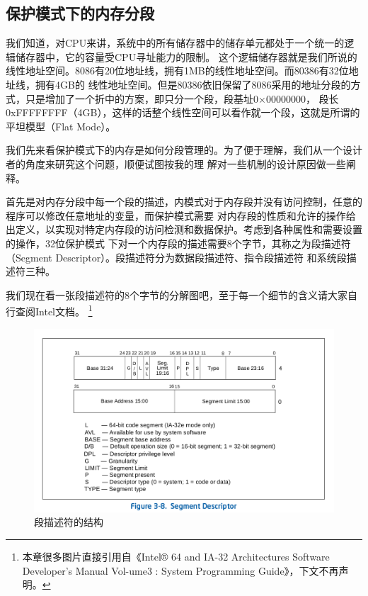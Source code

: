 \subsection{保护模式下的内存分段}

\par 我们知道，对CPU来讲，系统中的所有储存器中的储存单元都处于一个统一的逻辑储存器中，它的容量受CPU寻址能力的限制。\allowbreak
这个逻辑储存器就是我们所说的线性地址空间。8086有20位地址线，拥有1MB的线性地址空间。而80386有32位地址线，拥有4GB的\allowbreak
线性地址空间。但是80386依旧保留了8086采用的地址分段的方式，只是增加了一个折中的方案，即只分一个段，段基址0×00000000，\allowbreak
段长0xFFFFFFFF（4GB），这样的话整个线性空间可以看作就一个段，这就是所谓的平坦模型（Flat Mode）。

\par  我们先来看保护模式下的内存是如何分段管理的。为了便于理解，我们从一个设计者的角度来研究这个问题，顺便试图按我的理\allowbreak
解对一些机制的设计原因做一些阐释。

\par 首先是对内存分段中每一个段的描述，内模式对于内存段并没有访问控制，任意的程序可以修改任意地址的变量，而保护模式需要\allowbreak
对内存段的性质和允许的操作给出定义，以实现对特定内存段的访问检测和数据保护。考虑到各种属性和需要设置的操作，32位保护模式\allowbreak
下对一个内存段的描述需要8个字节，其称之为段描述符（Segment Descriptor）。段描述符分为数据段描述符、指令段描述符\allowbreak
和系统段描述符三种。

\par 我们现在看一张段描述符的8个字节的分解图吧，至于每一个细节的含义请大家自行查阅Intel文档。\allowbreak
\footnote{本章很多图片直接引用自《Intel® 64 and IA-32 Architectures Software Developer’s Manual Vol-ume3 :
System Programming Guide》，下文不再声明。}

\begin{figure}[ht]
      \centering
      \includegraphics[scale=0.45]{picture/chapt6/segment_descriptor.png}
      \caption{段描述符的结构}
\end{figure}

